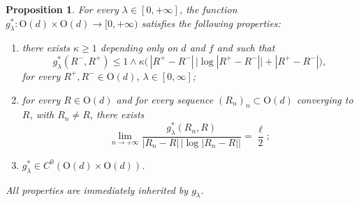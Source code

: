 \documentclass[a4paper,reqno]{amsart}
\newtheorem{proposition}[definition]{Proposition}
\theoremstyle{remark}
\newcommand{\On}{\mathrm{O}(d)}
\numberwithin{equation}{section}
\begin{document}
\begin{proposition}\label{prop:proprietag}
For every $\lambda\in [0,+\infty]$, the function $ g^*_\lambda \colon \On \times \On \to [0,+\infty)$ satisfies the following properties:
\begin{enumerate}
\item\label{prop:proprietag:upperbound}  there exists $\kappa \geq 1$ depending only on $d$ and $f$ and such that
	\begin{equation}\label{0105232216}
		g^*_\lambda( R^-, R^+) \leq 1 \wedge  \kappa  \Big(\, | R^+- R^-| \,\big|\log | R^+ - R^-|\big| +| R^+ - R^-|\Big),
	\end{equation}
	for every $ R^+,  R^- \in \On$, $\lambda\in [0,\infty]$;

\item\label{prop:proprietag:RS}  for every $R\in\On$ and for every sequence   $(R_n)_n \subset \On $  converging to  $R$, with $R_n \neq R$, there exists
	\[\lim_{n \to +\infty} \frac{g^*_\lambda(R_n, R)}{|R_n-R| \,\big|\log |R_n-R|\big|}=\frac{\ell}{2};
	\]
\item\label{prop:proprietag:C0}  $g^*_\lambda \in C^0(\On\times \On)$.
\end{enumerate}
All properties are immediately inherited by $g_\lambda$.
\end{proposition}
\end{document}
